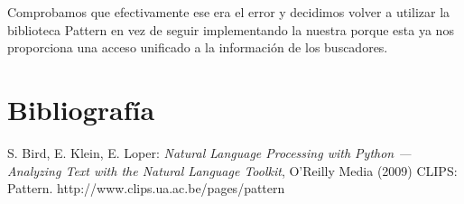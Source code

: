\documentclass[12pt,a4paper,titlepage]{article}
\begin{document}
Comprobamos que efectivamente ese era el error y decidimos volver a utilizar la biblioteca Pattern en vez de seguir implementando la nuestra porque esta ya nos proporciona una acceso unificado a la información de los buscadores.

\newpage
\section{Bibliografía}
\begin{thebibliography}{99}
S. Bird, E. Klein, E. Loper: \emph{Natural Language Processing with Python --- Analyzing Text with the Natural Language Toolkit}, O'Reilly Media (2009)
CLIPS: Pattern. http://www.clips.ua.ac.be/pages/pattern
\end{thebibliography}
\end{document}
